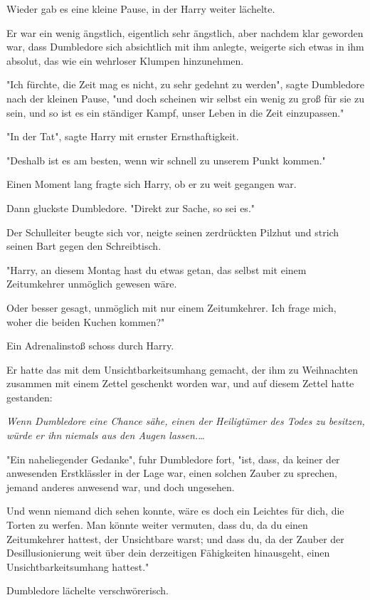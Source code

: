 {Wieder gab es eine kleine Pause, in der Harry weiter lächelte.

Er war ein wenig ängstlich, eigentlich sehr ängstlich, aber nachdem klar geworden war, dass Dumbledore sich absichtlich mit ihm anlegte, weigerte sich etwas in ihm absolut, das wie ein wehrloser Klumpen hinzunehmen.

"Ich fürchte, die Zeit mag es nicht, zu sehr gedehnt zu werden", sagte Dumbledore nach der kleinen Pause, "und doch scheinen wir selbst ein wenig zu groß für sie zu sein, und so ist es ein ständiger Kampf, unser Leben in die Zeit einzupassen."

"In der Tat", sagte Harry mit ernster Ernsthaftigkeit.

"Deshalb ist es am besten, wenn wir schnell zu unserem Punkt kommen."

Einen Moment lang fragte sich Harry, ob er zu weit gegangen war.

Dann gluckste Dumbledore. "Direkt zur Sache, so sei es."

Der Schulleiter beugte sich vor, neigte seinen zerdrückten Pilzhut und strich seinen Bart gegen den Schreibtisch.

"Harry, an diesem Montag hast du etwas getan, das selbst mit einem Zeitumkehrer unmöglich gewesen wäre.

Oder besser gesagt, unmöglich mit nur einem Zeitumkehrer. Ich frage mich, woher die beiden Kuchen kommen?"

Ein Adrenalinstoß schoss durch Harry.

Er hatte das mit dem Unsichtbarkeitsumhang gemacht, der ihm zu Weihnachten zusammen mit einem Zettel geschenkt worden war, und auf diesem Zettel hatte gestanden:

\emph{Wenn Dumbledore eine Chance sähe, einen der Heiligtümer des Todes zu besitzen, würde er ihn} \emph{niemals aus den Augen lassen.}…

"Ein naheliegender Gedanke", fuhr Dumbledore fort, "ist, dass, da keiner der anwesenden Erstklässler in der Lage war, einen solchen Zauber zu sprechen, jemand anderes anwesend war, und doch ungesehen.

Und wenn niemand dich sehen konnte, wäre es doch ein Leichtes für dich, die Torten zu werfen. Man könnte weiter vermuten, dass du, da du einen Zeitumkehrer hattest, der Unsichtbare warst; und dass du, da der Zauber der Desillusionierung weit über dein derzeitigen Fähigkeiten hinausgeht, einen Unsichtbarkeitsumhang hattest."

Dumbledore lächelte verschwörerisch.

}
